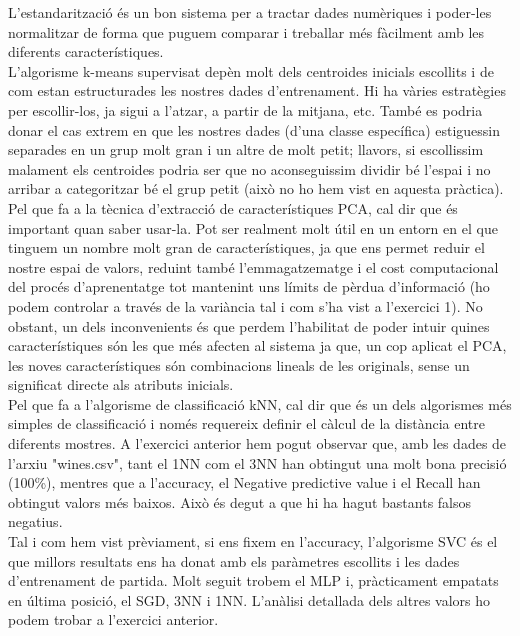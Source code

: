 \documentclass{article} %
\begin{document}
{\color{blue}
	L'estandarització és un bon sistema per a tractar dades numèriques i poder-les normalitzar de forma que puguem comparar i treballar més fàcilment amb les diferents característiques. \\

	L'algorisme k-means supervisat depèn molt dels centroides inicials escollits i de com estan estructurades les nostres dades d'entrenament. Hi ha vàries estratègies per escollir-los, ja sigui a l'atzar, a partir de la mitjana, etc. També es podria donar el cas extrem en que les nostres dades (d'una classe específica) estiguessin separades en un grup molt gran i un altre de molt petit; llavors, si escollissim malament els centroides podria ser que no aconseguissim dividir bé l'espai i no arribar a categoritzar bé el grup petit (això no ho hem vist en aquesta pràctica). \\

	Pel que fa a la tècnica d'extracció de característiques PCA, cal dir que és important quan saber usar-la. Pot ser realment molt útil en un entorn en el que tinguem un nombre molt gran de característiques, ja que ens permet reduir el nostre espai de valors, reduint també l'emmagatzematge i el cost computacional del procés d'aprenentatge tot mantenint uns límits de pèrdua d'informació (ho podem controlar a través de la variància tal i com s'ha vist a l'exercici 1). No obstant, un dels inconvenients és que perdem l'habilitat de poder intuir quines característiques són les que més afecten al sistema ja que, un cop aplicat el PCA, les noves característiques són combinacions lineals de les originals, sense un significat directe als atributs inicials. \\

	Pel que fa a l'algorisme de classificació kNN, cal dir que és un dels algorismes més simples de classificació i només requereix definir el càlcul de la distància entre diferents mostres. A l'exercici anterior hem pogut observar que, amb les dades de l'arxiu "wines.csv", tant el 1NN com el 3NN han obtingut una molt bona precisió (100\%), mentres que a l'accuracy, el Negative predictive value i el Recall han obtingut valors més baixos. Això és degut a que hi ha hagut bastants falsos negatius. \\

	Tal i com hem vist prèviament, si ens fixem en l'accuracy, l'algorisme SVC és el que millors resultats ens ha donat amb els paràmetres escollits i les dades d'entrenament de partida. Molt seguit trobem el MLP i, pràcticament empatats en última posició, el SGD, 3NN i 1NN. L'anàlisi detallada dels altres valors ho podem trobar a l'exercici anterior. \\

}
\end{document}
